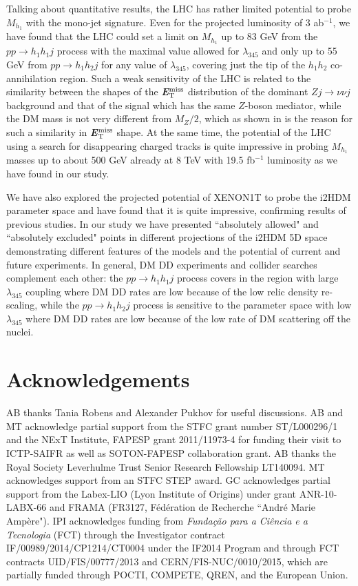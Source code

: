 \documentclass[12pt,a4paper]{article}
\newcommand{\MET}{\textbf{\textit{E}$_{\rm T}^{\rm miss}$}}
\providecommand{\DIFaddbegin}{} %
\begin{document}
Talking about quantitative results,
the LHC has rather limited potential to probe $M_{h_1}$
with the mono-jet signature. Even for the projected luminosity of 3 ab$^{-1}$,
we have found that the LHC could set a limit on $M_{h_1}$  up to 83 GeV
from the $pp\to h_1 h_1j$ process with the maximal value allowed for  $\lambda_{345}$
and  only up to 55 GeV from  $pp\to h_1 h_2j$
for any value of  $\lambda_{345}$, covering just the tip of the $h_1 h_2$ co-annihilation
region. Such a weak sensitivity of the LHC is related to
the similarity between the shapes of the \MET{} distribution of the dominant $Zj\to \nu\nu j$ background
and that of the signal which has the same $Z$-boson mediator, while the DM mass is not very different from $M_Z/2$,
which as shown in \cite{Belyaev:2016pxe} is the reason for such a similarity in \MET{} shape.
At the same time, the potential of the LHC using a search for disappearing charged tracks
is quite impressive  in probing  $M_{h_1}$ masses up to about 500 GeV
already at 8 TeV with 19.5 fb$^{-1}$ luminosity
as we have found in our study.


We have also explored the projected potential of XENON1T to probe the i2HDM
parameter space and have found that it is quite impressive,
confirming results of previous studies.
In our study we have presented  ``absolutely allowed"  and ``absolutely excluded" points
in different projections of the i2HDM 5D space demonstrating different features of the models
and the potential of current and future experiments.
In general, DM DD experiments and collider searches complement each other:
the $pp\to h_1 h_1j$ process covers in the region with large $\lambda_{345}$ coupling
where DM DD rates are low because of the low relic density re-scaling,
while the $pp\to h_1 h_2j$ process is sensitive to the parameter space with low $\lambda_{345}$
where DM DD rates are low because of the low rate of DM scattering off the nuclei.

\section*{Acknowledgements}

AB thanks Tania Robens and Alexander Pukhov for useful discussions.
AB and MT acknowledge partial support from the STFC grant number  ST/L000296/1
and the NExT Institute, FAPESP grant 2011/11973-4 for funding their visit to ICTP-SAIFR as well as SOTON-FAPESP collaboration grant.
AB thanks the Royal Society Leverhulme Trust Senior Research Fellowship LT140094.
MT acknowledges support from an STFC STEP award. 
GC acknowledges partial support from the Labex-LIO (Lyon Institute of Origins) under grant ANR-10-LABX-66 and FRAMA (FR3127, F\'ed\'eration de Recherche ``Andr\'e Marie Amp\`ere").
IPI acknowledges funding from \textit{Fun\-da\-\c{c}\~{a}o para a Ci\^{e}ncia e a Tecnologia} (FCT)
through the Investigator contract IF/00989/2014/CP1214/CT0004
under the IF2014 Program and through FCT contracts UID/FIS/00777/2013 and CERN/FIS-NUC/0010/2015,
which are partially funded through POCTI, COMPETE, QREN, and the European Union. 
\DIFaddbegin 
\end{document}
